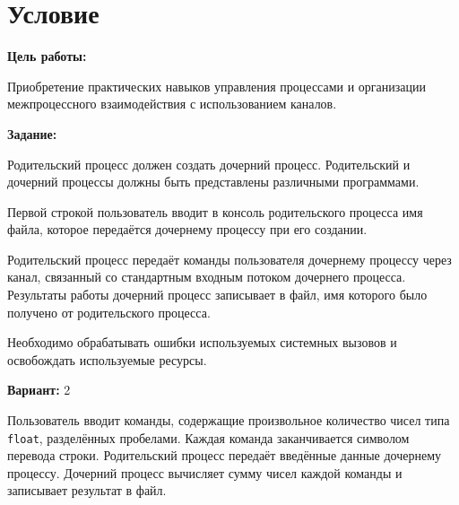 \section{Условие}

{\bfseries Цель работы:}

Приобретение практических навыков управления процессами и организации
межпроцессного взаимодействия с использованием каналов.

\vspace{10pt}

{\bfseries Задание:}

Родительский процесс должен создать дочерний процесс. Родительский и
дочерний процессы должны быть представлены различными программами.

Первой строкой пользователь вводит в консоль родительского процесса имя
файла, которое передаётся дочернему процессу при его создании.

Родительский процесс передаёт команды пользователя дочернему процессу
через канал, связанный со стандартным входным потоком дочернего процесса.
Результаты работы дочерний процесс записывает в файл, имя которого было
получено от родительского процесса.

Необходимо обрабатывать ошибки используемых системных вызовов и
освобождать используемые ресурсы.

\vspace{10pt}

{\bfseries Вариант:} 2

Пользователь вводит команды, содержащие произвольное количество чисел
типа \texttt{float}, разделённых пробелами. Каждая команда заканчивается
символом перевода строки. Родительский процесс передаёт введённые данные
дочернему процессу. Дочерний процесс вычисляет сумму чисел каждой команды
и записывает результат в файл.